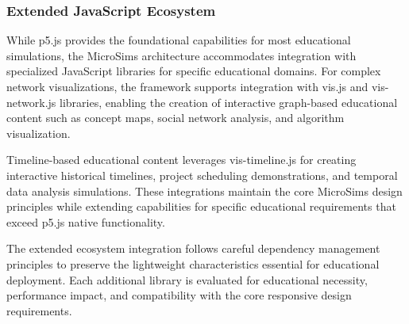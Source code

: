 \subsubsection{Extended JavaScript Ecosystem}

While p5.js provides the foundational capabilities for most educational simulations, the MicroSims architecture accommodates integration with specialized JavaScript libraries for specific educational domains. For complex network visualizations, the framework supports integration with vis.js and vis-network.js libraries, enabling the creation of interactive graph-based educational content such as concept maps, social network analysis, and algorithm visualization.

Timeline-based educational content leverages vis-timeline.js for creating interactive historical timelines, project scheduling demonstrations, and temporal data analysis simulations. These integrations maintain the core MicroSims design principles while extending capabilities for specific educational requirements that exceed p5.js native functionality.

The extended ecosystem integration follows careful dependency management principles to preserve the lightweight characteristics essential for educational deployment. Each additional library is evaluated for educational necessity, performance impact, and compatibility with the core responsive design requirements.
